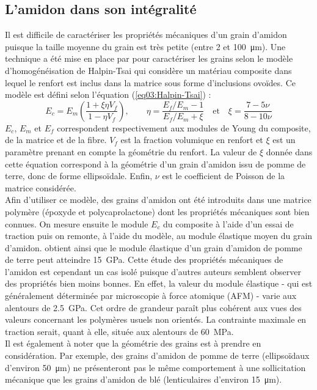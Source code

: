 	\subsection*{L'amidon dans son intégralité}
		Il est difficile de caractériser les propriétés mécaniques d'un grain d'amidon puisque la taille moyenne du grain est très petite (entre 2 et \SI{100}{\micro\meter}). Une technique a été mise en place par \citet{willett_mechanical_1994} pour caractériser les grains selon le modèle d'homogénéisation de Halpin-Tsai qui considère un matériau composite dans lequel le renfort est inclus dans la matrice sous forme d'inclusions ovoïdes. Ce modèle est défini selon l'équation (\ref{eq03:Halpin-Tsai}) :
		\begin{equation}\label{eq03:Halpin-Tsai}
		E_c=E_m\left(\frac{1+\xi\eta V_f}{1-\eta V_f}\right), \qquad \eta=\frac{E_f/E_m-1}{E_f/E_m+\xi}\quad\text{et}\quad \xi=\frac{7-5\nu}{8-10\nu}
		\end{equation}
		$E_c$, $E_m$ et $E_f$ correspondent respectivement aux modules de Young du composite, de la matrice et de la fibre. $V_f$ est la fraction volumique en renfort et $\xi$ est un paramètre prenant en compte la géométrie du renfort. La valeur de $\xi$ donnée dans cette équation correspond à la géométrie d'un grain d'amidon issu de pomme de terre, donc de forme ellipsoïdale. Enfin, $\nu$ est le coefficient de Poisson de la matrice considérée.
		\\Afin d'utiliser ce modèle, des grains d'amidon ont été introduits dans une matrice polymère (époxyde et polycaprolactone) dont les propriétés mécaniques sont bien connues. On mesure ensuite le module $E_c$ du composite à l'aide d'un essai de traction puis on remonte, à l'aide du modèle, au module élastique moyen du grain d'amidon. \citet{willett_mechanical_1994} obtient ainsi que le module élastique d'un grain d'amidon de pomme de terre peut atteindre \SI{15}{\giga\pascal}. Cette étude des propriétés mécaniques de l'amidon est cependant un cas isolé puisque d'autres auteurs \citep{schroeter_mechanical_1992, salerno_high_2014} semblent observer des propriétés bien moins bonnes. En effet, la valeur du module élastique - qui est généralement déterminée par microscopie à force atomique (AFM) - varie aux alentours de \SI{2.5}{\giga\pascal}. Cet ordre de grandeur paraît plus cohérent aux vues des valeurs concernant les polymères usuels non orientés. La contrainte maximale en traction serait, quant à elle, située aux alentours de \SI{60}{\mega\pascal}.
		\\Il est également à noter que la géométrie des grains est à prendre en considération. Par exemple, des grains d'amidon de pomme de terre (ellipsoïdaux d'environ \SI{50}{\micro\meter}) ne présenteront pas le même comportement à une sollicitation mécanique que les grains d'amidon de blé (lenticulaires d'environ \SI{15}{\micro\meter}).